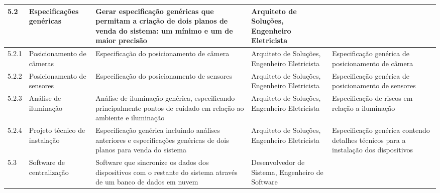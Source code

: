 \begin{landscape}
\begin{longtable}{@{\extracolsep{\fill}}  l  p{}  p{}  p{}  p{}  }
	\midrule
	5.2         & Especificações genéricas                               & Gerar especificação genéricas que permitam a criação de dois planos de venda do sistema: um mínimo e um de maior precisão                                                 & Arquiteto de Soluções, Engenheiro Eletricista                                                  &                                                                                                          \\*
	\midrule
	5.2.1       & Posicionamento de câmeras                                & Especificação do posicionamento de câmera                                                                                                                                     & Arquiteto de Soluções, Engenheiro Eletricista                                                  & Especificação genérica de posicionamento de câmera                                                   \\*
	\midrule
	5.2.2       & Posicionamento de sensores                                & Especificação do posicionamento de sensores                                                                                                                                    & Arquiteto de Soluções, Engenheiro Eletricista                                                  & Especificação genérica de posicionamento de sensores                                                  \\*
	\midrule
	5.2.3       & Análise de iluminação                                  & Análise de iluminação genérica, especificando principalmente pontos de cuidado em relação ao ambiente e iluminação                                                       & Arquiteto de Soluções, Engenheiro Eletricista                                                  & Especificação de riscos em relação a iluminação                                                    \\*
	\midrule
	5.2.4       & Projeto técnico de instalação                          & Especificação genérica incluindo análises anteriores e especificações genéricas de dois planos para venda do sistema                                                      & Arquiteto de Soluções, Engenheiro Eletricista                                                  & Especificação genérica contendo detalhes técnicos para a instalação dos dispositivos               \\*
	\midrule
	5.3         & Software de centralização                               & Software que sincronize os dados dos dispositivos com o restante do sistema através de um banco de dados em nuvem                                                               & Desenvolvedor de Sistema, Engenheiro de Software                                                 &                                                                                                          \\*

\end{longtable}
\end{landscape}
